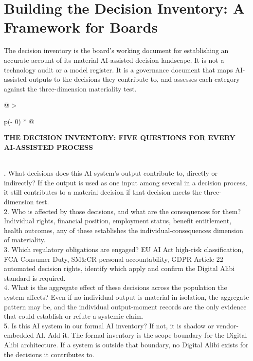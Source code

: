 \scenebreak

\section{Building the Decision Inventory: A Framework for Boards}

The decision inventory is the board's working document for establishing an accurate account of its material AI-assisted decision landscape. It is not a technology audit or a model register. It is a governance document that maps AI-assisted outputs to the decisions they contribute to, and assesses each category against the three-dimension materiality test.

\begin{longtable}[]{@{}
  >{\raggedright\arraybackslash}p{(\columnwidth - 0\tabcolsep) * }@{}}
\toprule\noalign{}
\begin{minipage}[b]{\linewidth}\raggedright
\textbf{THE DECISION INVENTORY: FIVE QUESTIONS FOR EVERY AI-ASSISTED PROCESS}
\end{minipage} \\
\midrule\noalign{}
\endhead
\bottomrule\noalign{}
. What decisions does this AI system's output contribute to, directly or indirectly? If the output is used as one input among several in a decision process, it still contributes to a material decision if that decision meets the three-dimension test. \\
2. Who is affected by those decisions, and what are the consequences for them? Individual rights, financial position, employment status, benefit entitlement, health outcomes, any of these establishes the individual-consequences dimension of materiality. \\
3. Which regulatory obligations are engaged? EU AI Act high-risk classification, FCA Consumer Duty, SM\&CR personal accountability, GDPR Article 22 automated decision rights, identify which apply and confirm the Digital Alibi standard is required. \\
4. What is the aggregate effect of these decisions across the population the system affects? Even if no individual output is material in isolation, the aggregate pattern may be, and the individual output-moment records are the only evidence that could establish or refute a systemic claim. \\
5. Is this AI system in our formal AI inventory? If not, it is shadow or vendor-embedded AI. Add it. The formal inventory is the scope boundary for the Digital Alibi architecture. If a system is outside that boundary, no Digital Alibi exists for the decisions it contributes to. \\
\end{longtable}


